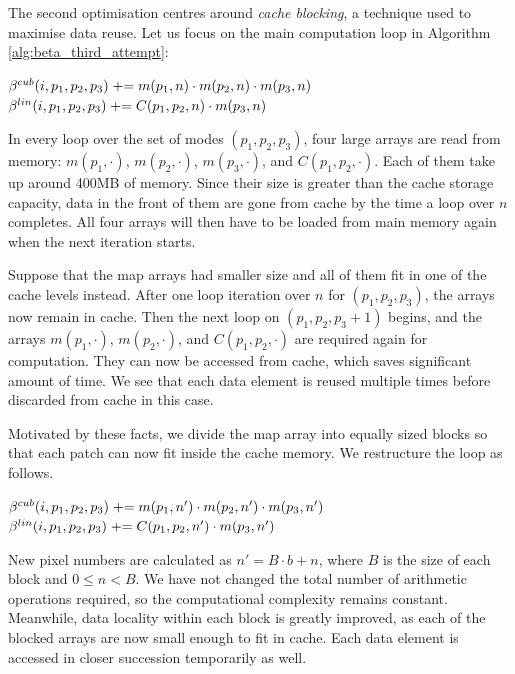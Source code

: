 The second optimisation centres around \textit{cache blocking}, a technique used to maximise data reuse. Let us focus on the main computation loop in Algorithm \ref{alg:beta_third_attempt}:

\begin{algorithmic}
			\State $\beta^{cub}(i, p_1, p_2, p_3) \mathrel{+}= m(p_1,n) \cdot m(p_2,n) \cdot m(p_3,n)$
			\State $\beta^{lin}(i, p_1, p_2, p_3) \mathrel{+}= C(p_1, p_2, n) \cdot m( p_3, n)$
		\EndFor
	\EndFor
\end{algorithmic}

In every loop over the set of modes $(p_1, p_2, p_3)$, four large arrays are read from memory: $m(p_1,\cdot)$, $m(p_2,\cdot)$, $m(p_3,\cdot)$, and $C(p_1, p_2, \cdot)$. Each of them take up around 400MB of memory. Since their size is greater than the cache storage capacity, data in the front of them are gone from cache by the time a loop over $n$ completes. All four arrays will then have to be loaded from main memory again when the next iteration starts.

Suppose that the map arrays had smaller size and all of them fit in one of the cache levels instead. After one loop iteration over $n$ for $(p_1, p_2, p_3)$, the arrays now remain in cache. Then the next loop on $(p_1, p_2, p_3+1)$ begins, and the arrays $m(p_1,\cdot)$, $m(p_2,\cdot)$, and $C(p_1,p_2,\cdot)$ are required again for computation. They can now be accessed from cache, which saves significant amount of time. We see that each data element is reused multiple times before discarded from cache in this case.

Motivated by these facts, we divide the map array into equally sized blocks so that each patch can now fit inside the cache memory. We restructure the loop as follows.

\begin{algorithmic}
				\State $\beta^{cub}(i, p_1, p_2, p_3) \mathrel{+}= m(p_1,n') \cdot m(p_2,n') \cdot m(p_3,n')$
				\State $\beta^{lin}(i, p_1, p_2, p_3) \mathrel{+}= C(p_1, p_2, n') \cdot m( p_3, n')$
			\EndFor
		\EndFor
	\EndFor
\end{algorithmic}

New pixel numbers are calculated as $n' = B \cdot b + n$, where $B$ is the size of each block and $0 \le n < B$. We have not changed the total number of arithmetic operations required, so the computational complexity remains constant. Meanwhile, data locality within each block is greatly improved, as each of the blocked arrays are now small enough to fit in cache. Each data element is accessed in closer succession temporarily as well.


